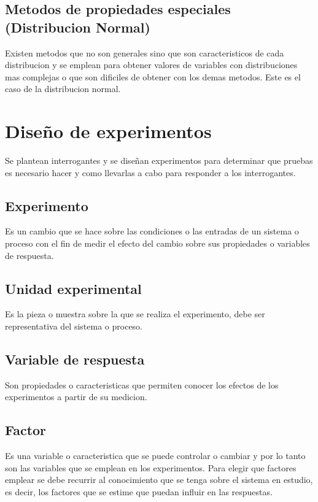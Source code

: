 \documentclass[a4paper]{article}
\begin{document}
\subsection*{Metodos de propiedades especiales (Distribucion Normal)}
Existen metodos que no son generales sino que son caracteristicos de cada distribucion y se emplean para obtener valores 
de variables con distribuciones mas complejas o que son dificiles de obtener con los demas metodos.
Este es el caso de la distribucion normal. %

\section*{Diseño de experimentos}
Se plantean interrogantes y se diseñan experimentos para determinar que pruebas es necesario hacer y como llevarlas a cabo para responder
a los interrogantes.

\subsection*{Experimento}
Es un cambio que se hace sobre las condiciones o las entradas de un sistema o proceso con el fin de medir el efecto del cambio sobre 
sus propiedades o variables de respuesta.

\subsection*{Unidad experimental}
Es la pieza o muestra sobre la que se realiza el experimento, debe ser representativa del sistema o proceso.

\subsection*{Variable de respuesta}
Son propiedades o caracteristicas que permiten conocer los efectos de los experimentos a partir de su medicion.

\subsection*{Factor}
Es una variable o caracteristica que se puede controlar o cambiar y por lo tanto son las variables que se emplean 
en los experimentos. Para elegir que factores emplear se debe recurrir al conocimiento que se tenga sobre el 
sistema en estudio, es decir, los factores que se estime que puedan influir en las respuestas.
\end{document}
